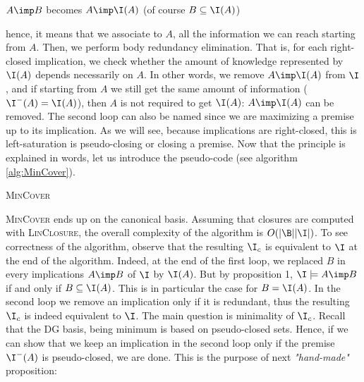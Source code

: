 \begin{center} $A \imp B$ becomes $A \imp \I(A)$ (of course $B \subseteq 
	\I(A)$)
\end{center}

\noindent hence, it means that we associate to $A$, all the information we can 
reach starting from $A$. Then, we perform body redundancy elimination. That is, 
for each right-closed implication, we check whether the amount of knowledge 
represented by $\I(A)$ depends necessarily on $A$. In other words, we remove
$A \imp \I(A)$ from $\I$, and if starting from $A$ we still get the same amount 
of information ($\I^{-}(A) = \I(A)$), then $A$ is not required to get $\I(A)$: $A \imp \I(A)$ can be removed. The second loop can also be named  since we are maximizing a premise up to its implication. As we will see, because implications are right-closed, this is left-saturation is pseudo-closing  or closing a premise. Now that the principle is explained in words, let us introduce the pseudo-code (see 
algorithm \ref{alg:MinCover}).

\vspace{1.2em}

\begin{algorithm}
	
	\BlankLine
	\BlankLine
	
	
	\BlankLine
	
	
	\caption{\textsc{MinCover}}
	\label{alg:MinCover}	
\end{algorithm}

\textsc{MinCover} ends up on the canonical basis. Assuming that 
closures are computed with \textsc{LinClosure}, the overall complexity of
the algorithm is $O(|\B||\I|)$. To see correctness of the algorithm, observe
that the resulting $\I_c$ is equivalent to $\I$ at the end of the algorithm.
Indeed, at the end of the first loop, we replaced $B$ in every implications $A 
\imp B$ of $\I$ by $\I(A)$. But by proposition 1, $\I \models A \imp B$ if and 
only if $B \subseteq \I(A)$. This is in particular the case for $B = \I(A)$.
In the second loop we remove an implication only if it is redundant, thus
the resulting $\I_c$ is indeed equivalent to $\I$. The main question is 
minimality of $\I_c$. Recall that the DG basis, being minimum is based on 
pseudo-closed sets. Hence, if we can show that we keep an implication in the 
second loop only if the premise $\I^{-}(A)$ is pseudo-closed, we are done. This
is the purpose of next \textit{"hand-made"} proposition:

